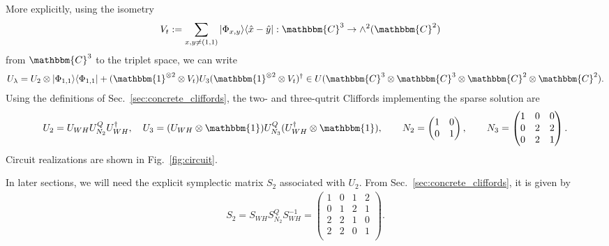 \documentclass[aps,nofootinbib,floatfix,a4paper]{revtex4}
\newcommand{\1}{\mbox{$\mathbf{1}$}}
\def\CC{\mathbbm{C}}
\def\Id{\mathbbm{1}}
\begin{document}
More explicitly, using the isometry 
\begin{align*}
	V_t&:= \sum_{x,y\neq (1,1)} 
	|\Phi_{x,y}\rangle\langle\hat x - \hat y|:
	\CC^3 \to \wedge^2(\CC^2)
\end{align*}
from $\CC^3$ to the triplet space,
we can write
\begin{align*}
	U_\lambda
	= 
	U_2 \otimes |\Phi_{1,1}\rangle\langle\Phi_{1,1}|
	+
	(\Id^{\otimes 2} \otimes V_t)
	U_3 
	(\Id^{\otimes 2} \otimes V_t)^\dagger
	\in
	U(\CC^3\otimes\CC^3\otimes\CC^2\otimes\CC^2).
\end{align*}
Using the definitions of Sec.~\ref{sec:concrete_cliffords}, the two- and three-qutrit Cliffords implementing the sparse solution are
\begin{align}\label{eqn:cliffords}
	U_2 
	= 
	U_{WH} U^Q_{N_2} U_{WH}^\dagger,
	\quad
	U_3 
	= 
	(U_{WH}\otimes\Id) U^Q_{N_3} (U_{WH}^\dagger\otimes \Id),
	\qquad
	N_2 = 
	\begin{pmatrix}
		1 & 0  \\
		0 & 1  \\
	\end{pmatrix},
	\qquad
	N_3 = 
	\begin{pmatrix}
		1 & 0  & 0 \\
		0 & 2  & 2 \\
		0 & 2  & 1
	\end{pmatrix}.
\end{align}
Circuit realizations are shown in Fig.~\ref{fig:circuit}.

In later sections, we will need the explicit symplectic matrix $S_2$
associated with 
$U_2$. 
From Sec.~\ref{sec:concrete_cliffords},  it is given by
\begin{align}\label{eqn:23cliff}
	S_2
	=
	S_{WH}
	S_{N_2}^Q
	S_{WH}^{-1}
	=
	\left(
	\begin{array}{cccc}
	 1 & 0 & 1 & 2 \\
	 0 & 1 & 2 & 1 \\
	 2 & 2 & 1 & 0 \\
	 2 & 2 & 0 & 1 \\
	\end{array}
	\right)
	.
\end{align}
\end{document}
